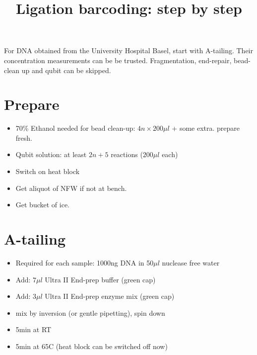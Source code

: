 \documentclass[aps,rmp]{revtex4}
\begin{document}
\title{Ligation barcoding: step by step}

\maketitle

For DNA obtained from the University Hospital Basel, start with A-tailing. Their concentration measurements can be be trusted. Fragmentation, end-repair, bead-clean up and qubit can be skipped.

\section*{Prepare}
\begin{itemize}
	\item 70\% Ethanol needed for bead clean-up: $4n\times 200\mu l$ + some extra. prepare fresh.
	\item Qubit solution: at least $2n+5$ reactions ($200\mu l $ each)
	\item Switch on heat block
	\item Get aliquot of NFW if not at bench.
	\item Get bucket of ice.
\end{itemize}

\section*{A-tailing}
\begin{itemize}
	\item Required for each sample: 1000ng DNA in 50$\mu l$ nuclease free water
	\item Add: $7\mu l$ Ultra II End-prep buffer	(green cap)
	\item Add: $3\mu l$ Ultra II End-prep enzyme mix (green cap)
	\item mix by inversion (or gentle pipetting), spin down
	\item 5min at RT
	\item 5min at 65C (heat block can be switched off now)
\end{itemize}
\end{document}
